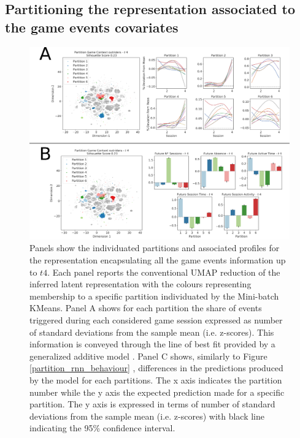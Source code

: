 \subsection{Partitioning the representation associated to the game events covariates}
\begin{figure}[ht]

\includegraphics[width=\textwidth]{images/chapter_4/clust_even_outr.png}
\centering
\caption[Partitions of the representations generated by the RNN architectures from the game events metrics]{Panels show the individuated partitions and associated profiles for the representation encapsulating all the game events information up to $t4$. Each panel reports the conventional UMAP reduction of the inferred latent representation with the colours representing membership to a specific partition individuated by the Mini-batch KMeans. Panel A shows for each partition the share of events triggered during each considered game session expressed as number of standard deviations from the sample mean (i.e. z-scores). This information is conveyed through the line of best fit provided by a generalized additive model \cite{serven2018}. Panel C shows, similarly to Figure \ref{partition_rnn_behaviour} , differences in the predictions produced by the model for each partitions. The x axis indicates the partition number while the y axis the expected prediction made for a specific partition. The y axis is expressed in terms of number of standard deviations from the sample mean (i.e. z-scores) with black line indicating the 95\% confidence interval.}
\label{clust_even_outr} 
\end{figure}

